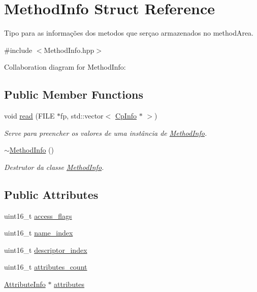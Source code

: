 \hypertarget{struct_method_info}{}\section{Method\+Info Struct Reference}
\label{struct_method_info}


Tipo para as informações dos metodos que serçao armazenados no method\+Area.  




{\ttfamily \#include $<$Method\+Info.\+hpp$>$}



Collaboration diagram for Method\+Info\+:
\subsection*{Public Member Functions}
\begin{DoxyCompactItemize}
\item 
void \hyperlink{struct_method_info_a96fbb8de441ef2af032c20d36d41eb7a}{read} (F\+I\+LE $\ast$fp, std\+::vector$<$ \hyperlink{class_cp_info}{Cp\+Info} $\ast$ $>$)
\begin{DoxyCompactList}\small\item\em Serve para preencher os valores de uma instância de \hyperlink{struct_method_info}{Method\+Info}. \end{DoxyCompactList}\item 
\hyperlink{struct_method_info_ab2a081a2855eec567e82adfff26059cd}{$\sim$\+Method\+Info} ()
\begin{DoxyCompactList}\small\item\em Destrutor da classe \hyperlink{struct_method_info}{Method\+Info}. \end{DoxyCompactList}\end{DoxyCompactItemize}
\subsection*{Public Attributes}
\begin{DoxyCompactItemize}
\item 
uint16\+\_\+t \hyperlink{struct_method_info_ab24f22a8b4e3dcae351b0aa9dc6b7051}{access\+\_\+flags}
\item 
uint16\+\_\+t \hyperlink{struct_method_info_afaa8591bae9244b2b47609e4919e4dbe}{name\+\_\+index}
\item 
uint16\+\_\+t \hyperlink{struct_method_info_a427ffc223f3b52b4d83fa6ee9e411089}{descriptor\+\_\+index}
\item 
uint16\+\_\+t \hyperlink{struct_method_info_ac7a3912757dd3af6ac55988fd42305f4}{attributes\+\_\+count}
\item 
\hyperlink{class_attribute_info}{Attribute\+Info} $\ast$ \hyperlink{struct_method_info_af480b7ee48a3812864ef16e3f0b44051}{attributes}
\end{DoxyCompactItemize}


